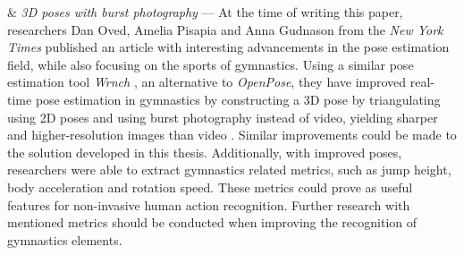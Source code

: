 \begin{easylist}[enumerate]
& \textit{3D poses with burst photography} --- At the time of writing this paper, researchers Dan Oved, Amelia Pisapia and Anna Gudnason from the \textit{New York Times} published an article with interesting advancements in the pose estimation field, while also focusing on the sports of gymnastics. Using a similar pose estimation tool \textit{Wrnch} \cite{wrnchai}, an alternative to \textit{OpenPose}, they have improved real-time pose estimation in gymnastics by constructing a 3D pose by triangulating using 2D poses and using burst photography instead of video, yielding sharper and higher-resolution images than video \cite{nyt-pose-estimation}. Similar improvements could be made to the solution developed in this thesis. Additionally, with improved poses, researchers were able to extract gymnastics related metrics, such as jump height, body acceleration and rotation speed. These metrics could prove as useful features for non-invasive human action recognition. Further research with mentioned metrics should be conducted when improving the recognition of gymnastics elements. 
    
\end{easylist}






















